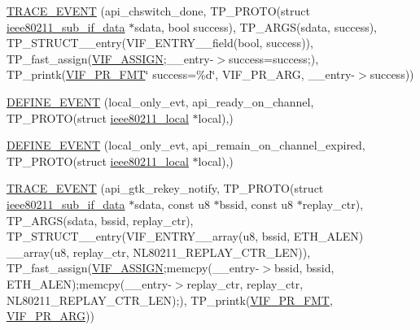 \begin{DoxyCompactItemize}
\item 
\hyperlink{driver-trace_8h_a6f5c84df6b12860bf8eb69dc156dea86}{T\-R\-A\-C\-E\-\_\-\-E\-V\-E\-N\-T} (api\-\_\-chswitch\-\_\-done, T\-P\-\_\-\-P\-R\-O\-T\-O(struct \hyperlink{structieee80211__sub__if__data}{ieee80211\-\_\-sub\-\_\-if\-\_\-data} $\ast$sdata, bool success), T\-P\-\_\-\-A\-R\-G\-S(sdata, success), T\-P\-\_\-\-S\-T\-R\-U\-C\-T\-\_\-\-\_\-entry(V\-I\-F\-\_\-\-E\-N\-T\-R\-Y\-\_\-\-\_\-field(bool, success)), T\-P\-\_\-fast\-\_\-assign(\hyperlink{driver-trace_8h_af5ede80f04ffcb3f644f68837b1d252c}{V\-I\-F\-\_\-\-A\-S\-S\-I\-G\-N};\-\_\-\-\_\-entry-\/$>$success=success;), T\-P\-\_\-printk(\hyperlink{driver-trace_8h_a50711161ccfc99a73b43b988149a61a5}{V\-I\-F\-\_\-\-P\-R\-\_\-\-F\-M\-T}\char`\"{} success=\%d\char`\"{}, V\-I\-F\-\_\-\-P\-R\-\_\-\-A\-R\-G, \-\_\-\-\_\-entry-\/$>$success))
\item 
\hyperlink{driver-trace_8h_a2626a0f88175be75dd9d32be5cf917cb}{D\-E\-F\-I\-N\-E\-\_\-\-E\-V\-E\-N\-T} (local\-\_\-only\-\_\-evt, api\-\_\-ready\-\_\-on\-\_\-channel, T\-P\-\_\-\-P\-R\-O\-T\-O(struct \hyperlink{structieee80211__local}{ieee80211\-\_\-local} $\ast$local),)
\item 
\hyperlink{driver-trace_8h_a6a9acbc9aeb95a144d0f2ec4f2a0adc0}{D\-E\-F\-I\-N\-E\-\_\-\-E\-V\-E\-N\-T} (local\-\_\-only\-\_\-evt, api\-\_\-remain\-\_\-on\-\_\-channel\-\_\-expired, T\-P\-\_\-\-P\-R\-O\-T\-O(struct \hyperlink{structieee80211__local}{ieee80211\-\_\-local} $\ast$local),)
\item 
\hyperlink{driver-trace_8h_a918645dca1f6488ecb2cb1616e4e311d}{T\-R\-A\-C\-E\-\_\-\-E\-V\-E\-N\-T} (api\-\_\-gtk\-\_\-rekey\-\_\-notify, T\-P\-\_\-\-P\-R\-O\-T\-O(struct \hyperlink{structieee80211__sub__if__data}{ieee80211\-\_\-sub\-\_\-if\-\_\-data} $\ast$sdata, const u8 $\ast$bssid, const u8 $\ast$replay\-\_\-ctr), T\-P\-\_\-\-A\-R\-G\-S(sdata, bssid, replay\-\_\-ctr), T\-P\-\_\-\-S\-T\-R\-U\-C\-T\-\_\-\-\_\-entry(V\-I\-F\-\_\-\-E\-N\-T\-R\-Y\-\_\-\-\_\-array(u8, bssid, E\-T\-H\-\_\-\-A\-L\-E\-N) \-\_\-\-\_\-array(u8, replay\-\_\-ctr, N\-L80211\-\_\-\-R\-E\-P\-L\-A\-Y\-\_\-\-C\-T\-R\-\_\-\-L\-E\-N)), T\-P\-\_\-fast\-\_\-assign(\hyperlink{driver-trace_8h_af5ede80f04ffcb3f644f68837b1d252c}{V\-I\-F\-\_\-\-A\-S\-S\-I\-G\-N};memcpy(\-\_\-\-\_\-entry-\/$>$bssid, bssid, E\-T\-H\-\_\-\-A\-L\-E\-N);memcpy(\-\_\-\-\_\-entry-\/$>$replay\-\_\-ctr, replay\-\_\-ctr, N\-L80211\-\_\-\-R\-E\-P\-L\-A\-Y\-\_\-\-C\-T\-R\-\_\-\-L\-E\-N);), T\-P\-\_\-printk(\hyperlink{driver-trace_8h_a50711161ccfc99a73b43b988149a61a5}{V\-I\-F\-\_\-\-P\-R\-\_\-\-F\-M\-T}, \hyperlink{driver-trace_8h_a12c9f3afcd1c461f7ae2f86fd8503977}{V\-I\-F\-\_\-\-P\-R\-\_\-\-A\-R\-G}))

\end{DoxyCompactItemize}
